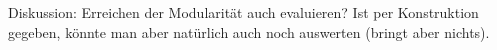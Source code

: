 


Diskussion: Erreichen der Modularität auch evaluieren? Ist per Konstruktion gegeben, könnte man aber natürlich auch noch auswerten (bringt aber nichts).


